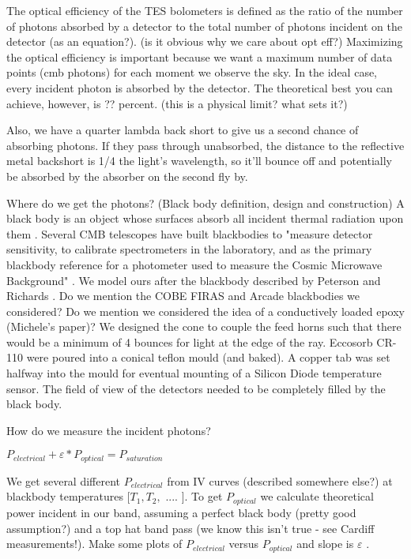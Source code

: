 The optical efficiency of the TES bolometers is defined as the ratio of the number of photons absorbed by a detector to the total number of photons incident on the detector (as an equation?). (is it obvious why we care about opt eff?) Maximizing the optical efficiency is important because we want a maximum number of data points (cmb photons) for each moment we observe the sky.  
In the ideal case, every incident photon is absorbed by the detector. The theoretical best you can achieve, however, is ?? percent. (this is a physical limit? what sets it?)

Also, we have a quarter lambda back short to give us a second chance of absorbing photons. If they pass through unabsorbed, the distance to the reflective metal backshort is 1/4 the light's wavelength, so it'll bounce off and potentially be absorbed by the absorber on the second fly by. 

Where do we get the photons? (Black body definition, design and construction)
A black body is an object whose surfaces absorb all incident thermal radiation upon them \cite{Eisberg}. Several CMB telescopes have built blackbodies \cite{} to "measure detector sensitivity, to calibrate spectrometers in the laboratory, and as the primary blackbody reference for a photometer used to measure the Cosmic Microwave Background" \cite{Peterson1984a}. We model ours after the blackbody described by Peterson and Richards \cite{Peterson1984a}. Do we mention the COBE FIRAS and Arcade blackbodies we considered? Do we mention we considered the idea of a conductively loaded epoxy (Michele's paper)? 
We designed the cone to couple the feed horns such that there would be a minimum of 4 bounces for light at the edge of the ray.
Eccosorb CR-110 were poured into a conical teflon mould (and baked). A copper tab was set halfway into the mould for eventual mounting of a Silicon Diode temperature sensor. 
The field of view of the detectors needed to be completely filled by the black body. 

How do we measure the incident photons?

$P_{electrical} + \varepsilon*P_{optical} = P_{saturation}$

We get several different $P_{electrical}$ from IV curves (described somewhere else?) at blackbody  temperatures [$T_{1}, T_{2},$ .... ]. To get $P_{optical}$ we calculate theoretical power incident in our band, assuming a perfect black body (pretty good assumption?) and a top hat band pass (we know this isn't true - see Cardiff measurements!). Make some plots of $P_{electrical}$  versus $P_{optical}$ and slope is $\varepsilon$ .

